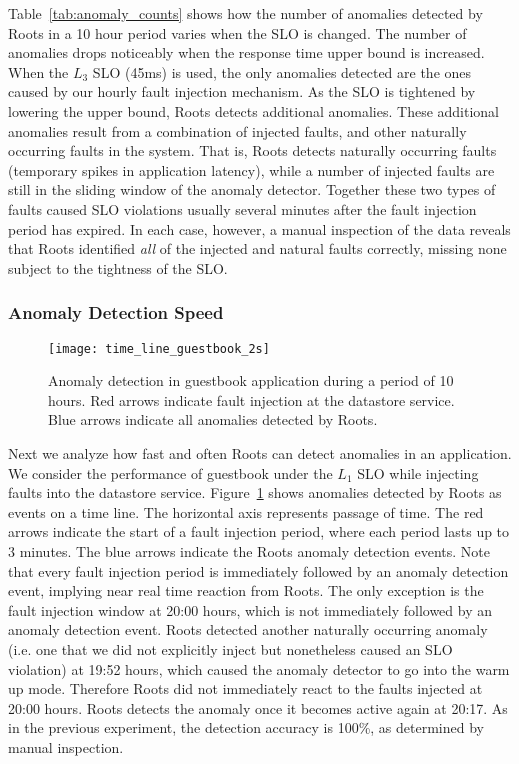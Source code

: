 Table~\ref{tab:anomaly_counts} shows how the number of anomalies detected by 
Roots in a 10 hour period varies when the SLO is changed. The number of anomalies
drops noticeably when the response time upper bound is increased. When the $L_3$
SLO (45ms) is used, the only anomalies detected are the ones
caused by our hourly fault injection mechanism. As the SLO is tightened by lowering the upper bound,
Roots detects additional anomalies. These additional anomalies
result from a combination of injected faults, and other naturally occurring faults
in the system. That is, Roots detects naturally occurring
faults (temporary spikes in application latency), while a number of injected faults
are still in the sliding window of the anomaly detector. Together these two types of
faults caused SLO violations usually several minutes after the fault injection period
has expired.  In each case, however, a manual inspection of the data reveals
that Roots identified \textit{all} of the injected and natural faults correctly,
missing none subject to the tightness of the SLO.

\subsubsection{Anomaly Detection Speed}

\begin{figure}
\centering
\texttt{[image: time\_line\_guestbook\_2s]}
\caption{Anomaly detection in guestbook application during a period of 10 hours. 
Red arrows indicate fault injection
at the datastore service. Blue arrows indicate all anomalies detected by
Roots.
}
\vspace{-0.1in}
\label{fig:time_line_guestbook_2s}
\end{figure}

Next we analyze how fast and often Roots can detect anomalies in an application. We
consider the performance of guestbook under the $L_1$ SLO while 
injecting faults into the datastore service. Figure~\ref{fig:time_line_guestbook_2s} shows
anomalies detected by Roots as events on a time line. The horizontal axis represents 
passage of time. The red arrows indicate the start of a fault injection period, where each
period lasts up to 3 minutes.
The blue arrows indicate the Roots anomaly detection events.
Note that every fault injection period is immediately followed by an anomaly
detection event, implying near real time reaction from Roots. The only exception is the fault
injection window at 20:00 hours, which is not immediately followed by an anomaly 
detection event. Roots detected another naturally occurring anomaly
(i.e. one
that we did not explicitly inject but nonetheless caused an SLO violation) at 19:52 hours,
which caused the anomaly detector to go into the warm up mode. Therefore Roots
did not immediately react to the faults injected at 20:00 hours. Roots detects the anomaly once it becomes
active again at 20:17. As in the previous
experiment, the detection accuracy is 100\%, as determined by manual
inspection.

